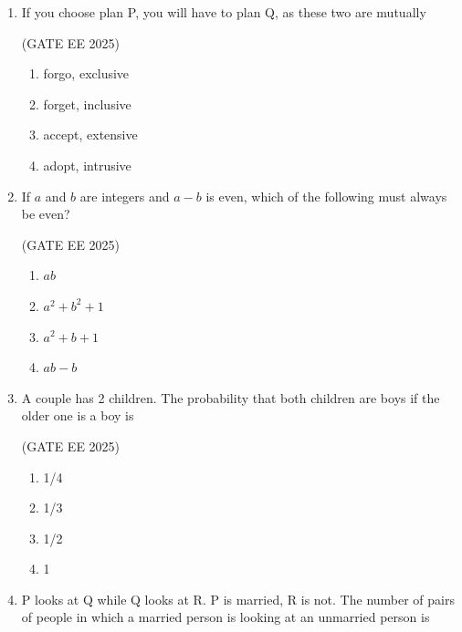 \documentclass[journal,12pt,onecolumn]{IEEEtran}
\theoremstyle{remark}
\begin{document}
\begin{enumerate}
\item If you choose plan P, you will have to \underline{\hspace{2cm}} plan Q, as these two are mutually \underline{\hspace{2cm}}  

\hfill(GATE EE 2025)

\begin{multicols}{2}
    \begin{enumerate}
        \item forgo, exclusive 
        \item forget, inclusive  
        \item accept, extensive 
        \item adopt, intrusive  
    \end{enumerate}
\end{multicols}

\item If $a$ and $b$ are integers and $a-b$ is even, which of the following must always be even? 

\hfill(GATE EE 2025)

\begin{multicols}{4}
    \begin{enumerate}
        \item $ab$ 
        \item $a^2 + b^2 + 1$  
        \item $a^2+b+1$
        \item $ab-b$  
    \end{enumerate}
\end{multicols}

\item A couple has 2 children. The probability that both children are boys if the older one is a boy is 

\hfill(GATE EE 2025)

\begin{multicols}{4}
\begin{enumerate}
\item 1/4
\item 1/3
\item 1/2
\item 1
\end{enumerate}
\end{multicols}

\item P looks at Q while Q looks at R. P is married, R is not. The number of pairs of people in which a married person is looking at an unmarried person is  


\end{enumerate}
\end{document}
